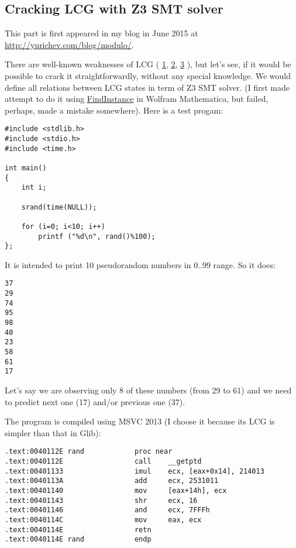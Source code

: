 \subsection{Cracking \ac{LCG} with Z3 \ac{SMT} solver}

This part is first appeared in my blog in June 2015 at \url{http://yurichev.com/blog/modulo/}.

There are well-known weaknesses of LCG (
\href{http://en.wikipedia.org/wiki/Linear_congruential_generator#Advantages_and_disadvantages_of_LCGs}{1},
\href{http://www.reteam.org/papers/e59.pdf}{2},
\href{http://stackoverflow.com/questions/8569113/why-1103515245-is-used-in-rand/8574774#8574774}{3}
), but let's see, if it would be possible to crack it straightforwardly, without any special knowledge.
We would define all relations between LCG states in term of Z3 \ac{SMT} solver.
(I first made attempt to do it using \href{https://reference.wolfram.com/language/ref/FindInstance.html}{FindInstance} in Wolfram Mathematica, but failed, perhaps, made a mistake somewhere).
Here is a test progam:

\begin{lstlisting}
#include <stdlib.h>
#include <stdio.h>
#include <time.h>

int main()
{
	int i;

	srand(time(NULL));

	for (i=0; i<10; i++)
		printf ("%d\n", rand()%100);
};
\end{lstlisting}

It is intended to print 10 pseudorandom numbers in 0..99 range.
So it does:

\begin{lstlisting}
37
29
74
95
98
40
23
58
61
17
\end{lstlisting}

Let's say we are observing only 8 of these numbers (from 29 to 61) and we need to predict next one (17) and/or previous one (37).

The program is compiled using MSVC 2013 (I choose it because its LCG is simpler than that in Glib):

\begin{lstlisting}
.text:0040112E rand            proc near
.text:0040112E                 call    __getptd
.text:00401133                 imul    ecx, [eax+0x14], 214013
.text:0040113A                 add     ecx, 2531011
.text:00401140                 mov     [eax+14h], ecx
.text:00401143                 shr     ecx, 16
.text:00401146                 and     ecx, 7FFFh
.text:0040114C                 mov     eax, ecx
.text:0040114E                 retn
.text:0040114E rand            endp
\end{lstlisting}

